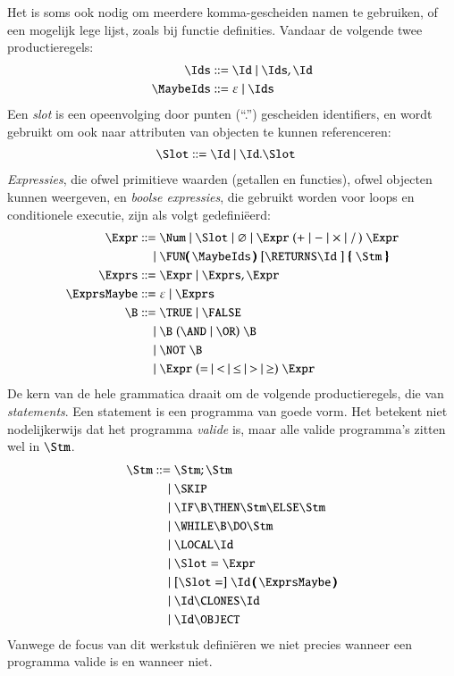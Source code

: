 Het is soms ook nodig om meerdere komma-gescheiden namen te gebruiken, of een mogelijk lege lijst, zoals bij functie definities. Vandaar de volgende twee productieregels:
\begin{align*}
  \Ids \GrammarDef \Id \mid \Ids, \Id \\
  \MaybeIds \GrammarDef \varepsilon \mid \Ids
\end{align*}
Een \emph{slot}%
is een opeenvolging door punten (``.'') gescheiden identifiers,%
en wordt gebruikt om ook naar attributen van objecten te kunnen referenceren:%
\begin{align*}
  \Slot \GrammarDef \Id \mid \Id . \Slot
\end{align*}
\emph{Expressies}, die ofwel primitieve waarden (getallen en functies), ofwel objecten kunnen weergeven, en \emph{boolse expressies}, die gebruikt worden voor loops en conditionele executie, zijn als volgt gedefiniëerd:%
\begin{align*}
  \Expr \GrammarDef \Num \mid \Slot \mid \varnothing \mid \Expr\; (+ \mid - \mid \times \mid /\,)\; \Expr \\
  \GrammarOr \FUN\pmb{(}\,\MaybeIds\,\pmb{)}\; \GrammarOpt{\RETURNS \Id\;} \pmb{\{}\; \Stm\; \pmb{\}} \\
  \Exprs \GrammarDef \Expr \mid \Exprs, \Expr \\
  \ExprsMaybe \GrammarDef \varepsilon \mid \Exprs \\
  \B \GrammarDef \TRUE \mid \FALSE \\
  \GrammarOr \B\; (\AND \mid \OR)\; \B \\
  \GrammarOr \NOT\; \B \\
  \GrammarOr \Expr\; (=\: \mid\: <\: \mid\: \le\: \mid\: >\: \mid\: \ge)\; \Expr
\end{align*}
De kern van de hele grammatica draait om de volgende productieregels, die van \emph{statements}. Een statement is een programma van goede vorm. Het betekent niet nodelijkerwijs%
dat het programma \emph{valide} is, maar alle valide programma's zitten wel in $\Stm$.
\begin{align*}
  \Stm \GrammarDef \Stm; \Stm \\
  \GrammarOr \SKIP \\
  \GrammarOr \IF \B \THEN \Stm \ELSE \Stm \\
  \GrammarOr \WHILE \B \DO \Stm \\
  \GrammarOr \LOCAL \Id \\
  \GrammarOr \Slot = \Expr \\
  \GrammarOr \GrammarOpt{\Slot =} \Id\,\pmb{(}\,\ExprsMaybe\,\pmb{)} \\
  \GrammarOr \Id \CLONES \Id \\
  \GrammarOr \Id \OBJECT
\end{align*}
Vanwege de focus van dit werkstuk definiëren we niet precies wanneer een programma valide is en wanneer niet.

